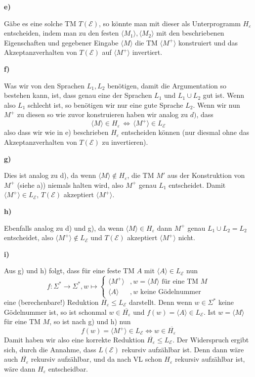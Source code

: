 \documentclass[a4paper,graphics,11pt]{article}
\newcommand{\eps}[0]{\varepsilon}
\newcommand{\godel}[1]{\langle #1 \rangle}
\begin{document}
\newpage

\textbf{e)}

Gäbe es eine solche TM $T(\mathcal{E})$, so könnte man mit dieser als Unterprogramm $H_\eps$ entscheiden, indem
man zu den festen $\godel{M_1},\godel{M_2}$ mit den beschriebenen Eigenschaften und gegebener Eingabe
$\godel{M}$ die TM $\godel{M^+}$ konstruiert und das Akzeptanzverhalten von $T(\mathcal{E})$ auf $\godel{M^+}$
invertiert.

\strut

\textbf{f)}

Was wir von den Sprachen $L_1,L_2$ benötigen, damit die Argumentation so bestehen kann, ist, dass
genau eine der Sprachen $L_1$ und $L_1 \cup L_2$ gut ist. Wenn also $L_1$ schlecht ist, so benötigen
wir nur eine gute Sprache $L_2$. Wenn wir nun $M^+$ zu diesen so wie zuvor konstruieren haben wir
analog zu $d)$, dass
$$
    \godel{M} \in H_\eps \,\Longleftrightarrow\, \godel{M^+} \in L_\mathcal{E}
$$
also dass wir wie in e) beschrieben $H_\eps$ entscheiden können (nur diesmal ohne das Akzeptanzverhalten von $T(\mathcal{E})$ zu invertieren).

\strut

\textbf{g)}

Dies ist analog zu d), da wenn $\godel{M} \notin H_\eps$, die TM $M'$ aus der Konstruktion von $M^+$ (siehe a))
niemals halten wird, also $M^+$ genau $L_1$ entscheidet. Damit $\godel{M^+} \in L_\mathcal{E}$, $T(\mathcal{E})$
akzeptiert $\godel{M^+}$.

\strut

\textbf{h)}

Ebenfalls analog zu d) und g), da wenn $\godel{M} \in H_\eps$ dann $M^+$ genau $L_1 \cup L_2 = L_2$ entscheidet,
also $\godel{M^+} \notin L_\mathcal{E}$ und $T(\mathcal{E})$ akzeptiert $\godel{M^+}$ nicht.

\strut

\textbf{i)}

Aus g) und h) folgt, dass für eine feste TM $A$ mit $\godel{A} \in L_\mathcal{E}$ nun
$$
    f : \Sigma^* \to \Sigma^*, w \mapsto \begin{cases}
        \godel{M^+} &, w = \godel{M} \text{ für eine TM $M$}\\
        \godel{A} &, w \text{ keine Gödelnummer}
    \end{cases}
$$
eine (berechenbare!) Reduktion $\overline{H_\eps} \leq L_\mathcal{E}$ darstellt. Denn wenn $w \in \Sigma^*$ keine Gödelnummer ist,
so ist schonmal $w \in \overline{H_\eps}$ und $f(w) = \godel{A} \in L_\mathcal{E}$. Ist $w = \godel{M}$ für
eine TM $M$, so ist nach g) und h) nun
$$
    f(w) = \godel{M^+} \in L_\mathcal{E} \iff w \in \overline{H_\eps}
$$
Damit haben wir also eine korrekte Reduktion $\overline{H_\eps} \leq L_\mathcal{E}$. Der Widerspruch ergibt sich,
durch die Annahme, dass $L(\mathcal{E})$ rekursiv aufzählbar ist. Denn dann wäre auch $\overline{H_\eps}$
rekursiv aufzählbar, und da nach VL schon $H_\eps$ rekursiv aufzählbar ist, wäre dann $H_\eps$ entscheidbar.
\end{document}
